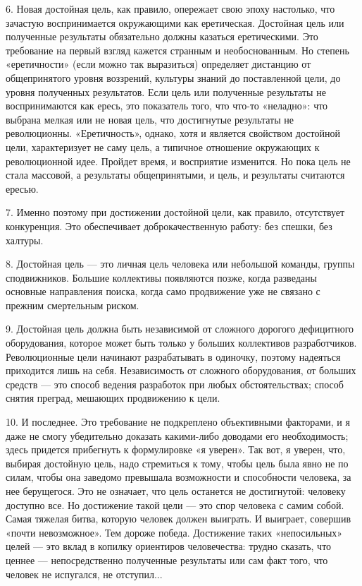6.   Новая  достойная   цель,  как   правило,  опережает   свою  эпоху
настолько,  что зачастую  воспринимается окружающими  как еретическая.
Достойная цель  или полученные результаты обязательно  должны казаться
еретическими.  Это  требование на  первый  взгляд  кажется странным  и
необоснованным. Но  степень «еретичности» (если можно  так выразиться)
определяет  дистанцию  от  общепринятого  уровня  воззрений,  культуры
знаний до  поставленной цели,  до уровня полученных  результатов. Если
цель  или  полученные  результаты  не воспринимаются  как  ересь,  это
показатель того, что что-то «неладно»: что выбрана мелкая или не новая
цель,  что  достигнутые  результаты  не  революционны.  «Еретичность»,
однако,  хотя и  является свойством  достойной цели,  характеризует не
саму  цель,  а типичное  отношение  окружающих  к революционной  идее.
Пройдет время, и восприятие изменится. Но пока цель не стала массовой,
а результаты общепринятыми, и цель, и результаты считаются ересью.

7.  Именно  поэтому  при   достижении  достойной  цели,  как  правило,
отсутствует  конкуренция. Это  обеспечивает доброкачественную  работу:
без спешки, без халтуры.


8. Достойная  цель — это  личная цель человека или  небольшой команды,
группы  сподвижников.  Большие   коллективы  появляются  позже,  когда
разведаны основные  направления поиска, когда само  продвижение уже не
связано с прежним смертельным риском.

9.  Достойная  цель  должна  быть  независимой  от  сложного  дорогого
дефицитного  оборудования,   которое  может  быть  только   у  больших
коллективов разработчиков. Революционные цели начинают разрабатывать в
одиночку, поэтому надеяться приходится  лишь на себя. Независимость от
сложного  оборудования,  от  больших  средств  —  это  способ  ведения
разработок при любых обстоятельствах;  способ снятия преград, мешающих
продвижению к цели.

10. И последнее. Это требование не подкреплено объективными факторами,
и  я  даже не  смогу  убедительно  доказать какими-либо  доводами  его
необходимость; здесь  придется прибегнуть  к формулировке  «я уверен».
Так  вот,  я уверен,  что,  выбирая  достойную цель,  надо  стремиться
к  тому,  чтобы  цель  была  явно не  по  силам,  чтобы  она  заведомо
превышала возможности  и способности человека, за  нее берущегося. Это
не означает, что цель останется не достигнутой: человеку доступно все.
Но достижение  такой цели  — это  спор человека  с самим  собой. Самая
тяжелая битва,  которую человек должен выиграть.  И выиграет, совершив
«почти невозможное». Тем дороже победа. Достижение таких «непосильных»
целей — это  вклад в копилку ориентиров  человечества: трудно сказать,
что ценнее — непосредственно полученные  результаты или сам факт того,
что человек не испугался, не отступил...





